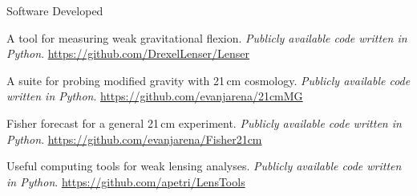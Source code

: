 \documentclass{resume} %
\begin{document}

\begin{rSection}{Software Developed}

\underline{}

\begin{description}[leftmargin=10em, style=nextline]

\item[\texttt{Lenser}] A tool for measuring weak gravitational flexion. \textit{Publicly available code written in Python}. \href{https://github.com/DrexelLenser/Lenser}{https://github.com/DrexelLenser/Lenser}

\item[21cmMG] A suite for probing modified gravity with 21\,cm cosmology. \textit{Publicly available code written in Python}. \href{https://github.com/evanjarena/21cmMG}{https://github.com/evanjarena/21cmMG}

\item[Fisher21cm] Fisher forecast for a general 21\,cm experiment. \textit{Publicly available code written in Python}. \href{https://github.com/evanjarena/Fisher21cm}{https://github.com/evanjarena/Fisher21cm}

\end{description}

\underline{}

\begin{description}[leftmargin=10em, style=nextline]

\item[\texttt{LensTools}] Useful computing tools for weak lensing analyses. \textit{Publicly available code written in Python}. \href{https://github.com/apetri/LensTools}{https://github.com/apetri/LensTools}

\end{description}

\end{rSection}

\end{document}

